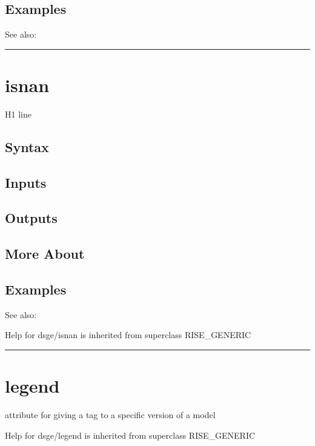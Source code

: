 \documentclass[letterpaper,10pt,english]{sphinxmanual}
\begin{document}
\subsection{Examples}
\label{classes/models/@dsge/dsge:id88}
See also:


\bigskip\hrule{}\bigskip



\section{isnan}
\label{classes/models/@dsge/dsge:isnan}\label{classes/models/@dsge/dsge:id89}
H1 line


\subsection{Syntax}
\label{classes/models/@dsge/dsge:id90}

\subsection{Inputs}
\label{classes/models/@dsge/dsge:id91}

\subsection{Outputs}
\label{classes/models/@dsge/dsge:id92}

\subsection{More About}
\label{classes/models/@dsge/dsge:id93}

\subsection{Examples}
\label{classes/models/@dsge/dsge:id94}
See also:

Help for dsge/isnan is inherited from superclass RISE\_GENERIC


\bigskip\hrule{}\bigskip



\section{legend}
\label{classes/models/@dsge/dsge:legend}\label{classes/models/@dsge/dsge:id95}
attribute for giving a tag to a specific version of a model

Help for dsge/legend is inherited from superclass RISE\_GENERIC
\end{document}
